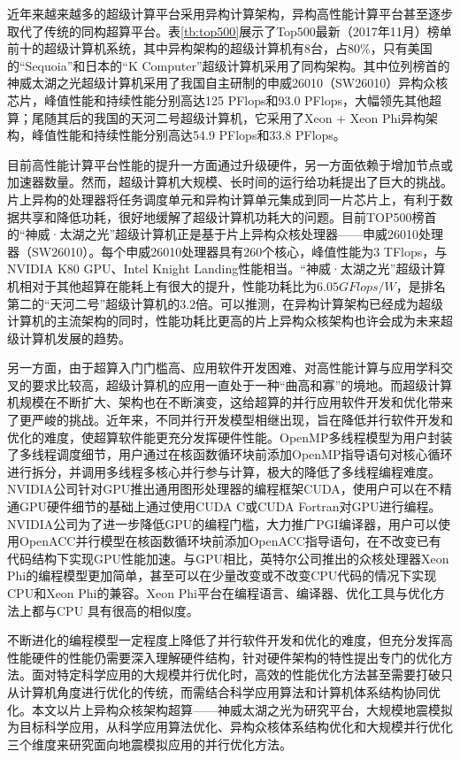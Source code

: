 近年来越来越多的超级计算平台采用异构计算架构\cite{buyya1999high}，异构高性能计算平台甚至逐步取代了传统的同构超算平台。表\ref{tb:top500}展示了Top500最新（2017年11月）榜单前十的超级计算机系统，其中异构架构的超级计算机有8台，占80\%，只有美国的“Sequoia”和日本的“K Computer”超级计算机采用了同构架构。其中位列榜首的神威太湖之光超级计算机采用了我国自主研制的申威26010（SW26010）异构众核芯片，峰值性能和持续性能分别高达125 PFlops和93.0 PFlops，大幅领先其他超算；尾随其后的我国的天河二号超级计算机，它采用了Xeon + Xeon Phi异构架构，峰值性能和持续性能分别高达54.9 PFlops和33.8 PFlops。

目前高性能计算平台性能的提升一方面通过升级硬件，另一方面依赖于增加节点或加速器数量。然而，超级计算机大规模、长时间的运行给功耗提出了巨大的挑战\cite{reed2015exascale}。片上异构的处理器将任务调度单元和异构计算单元集成到同一片芯片上，有利于数据共享和降低功耗，很好地缓解了超级计算机功耗大的问题。目前TOP500榜首的“神威·太湖之光”超级计算机正是基于片上异构众核处理器\cite{fu2016sunway}——申威26010处理器（SW26010）。每个申威26010处理器具有260个核心，峰值性能为3 TFlops，与NVIDIA K80 GPU、Intel Knight Landing性能相当\cite{einkemmer2017evaluation,sodani2016knights}。“神威·太湖之光”超级计算机相对于其他超算在能耗上有很大的提升，性能功耗比为$6.05GFlops/W$，是排名第二的“天河二号”超级计算机的3.2倍。可以推测，在异构计算架构已经成为超级计算机的主流架构的同时，性能功耗比更高的片上异构众核架构也许会成为未来超级计算机发展的趋势。

另一方面，由于超算入门门槛高、应用软件开发困难、对高性能计算与应用学科交叉的要求比较高，超级计算机的应用一直处于一种“曲高和寡”的境地。而超级计算机规模在不断扩大、架构也在不断演变，这给超算的并行应用软件开发和优化带来了更严峻的挑战。近年来，不同并行开发模型相继出现，旨在降低并行软件开发和优化的难度，使超算软件能更充分发挥硬件性能。OpenMP多线程模型为用户封装了多线程调度细节，用户通过在核函数循环块前添加OpenMP指导语句对核心循环进行拆分，并调用多线程多核心并行参与计算，极大的降低了多线程编程难度。NVIDIA公司针对GPU推出通用图形处理器的编程框架CUDA\cite{cook2012cuda}，使用户可以在不精通GPU硬件细节的基础上通过使用CUDA C或CUDA Fortran对GPU进行编程。NVIDIA公司为了进一步降低GPU的编程门槛，大力推广PGI编译器，用户可以使用OpenACC并行模型在核函数循环块前添加OpenACC指导语句，在不改变已有代码结构下实现GPU性能加速。与GPU相比，英特尔公司推出的众核处理器Xeon Phi的编程模型更加简单，甚至可以在少量改变或不改变CPU代码的情况下实现CPU和Xeon Phi的兼容。Xeon Phi平台在编程语言、编译器、优化工具与优化方法上都与CPU 具有很高的相似度。

不断进化的编程模型一定程度上降低了并行软件开发和优化的难度，但充分发挥高性能硬件的性能仍需要深入理解硬件结构，针对硬件架构的特性提出专门的优化方法。面对特定科学应用的大规模并行优化时，高效的性能优化方法甚至需要打破只从计算机角度进行优化的传统，而需结合科学应用算法和计算机体系结构协同优化。本文以片上异构众核架构超算——神威太湖之光为研究平台，大规模地震模拟为目标科学应用，从科学应用算法优化、异构众核体系结构优化和大规模并行优化三个维度来研究面向地震模拟应用的并行优化方法。

